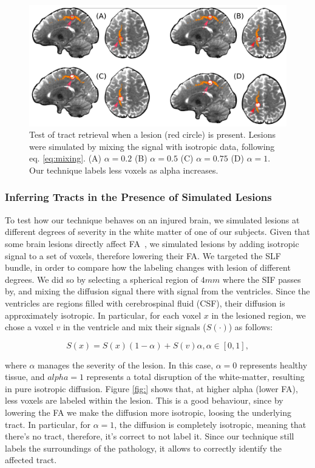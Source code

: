 \begin{figure}[t]
    \includegraphics[width=\textwidth]{7.multiatlas/img/pathology.png}
    \caption{Test of tract retrieval when a lesion (red circle) is present.
             Lesions were simulated by mixing the signal with isotropic data,
             following eq. \ref{eq:mixing}. (A) $\alpha=0.2$
             (B) $\alpha=0.5$ (C) $\alpha=0.75$ (D) $\alpha=1$. Our technique
             labels less voxels as alpha increases.}
    \label{fig:labeling}
\end{figure}

\subsubsection{Inferring Tracts in the Presence of Simulated Lesions}
To test how our technique behaves on an injured brain, we simulated
lesions at different degrees of severity in the white matter of one of our subjects.
Given that some brain lesions directly affect FA~\cite{Schonberg2006, Huisman2009},
we simulated lesions by adding isotropic signal to a set of voxels, therefore
lowering their FA. We targeted the SLF bundle, in order to compare how the labeling
changes with lesion of different degrees. We did so by selecting a spherical region
of $4mm$ where the SIF passes by, and mixing the diffusion signal there with signal
from the ventricles. Since the ventricles are regions filled with cerebrospinal
fluid (CSF), their diffusion is approximately isotropic. In particular, for each
voxel $x$ in the lesioned region, we chose a voxel $v$ in the ventricle and mix
their signals ($S(\cdot)$) as follows:

\begin{equation}
    \label{eq:mixing}
S(x) = S(x)(1-\alpha) + S(v)\alpha, \alpha \in [0,1],
\end{equation}

where $\alpha$ manages the severity of the lesion. In this case, $\alpha=0$
represents healthy tissue, and $alpha=1$ represents a total disruption of
the white-matter, resulting in pure isotropic diffusion. Figure \ref{fig:}
shows that, at higher alpha (lower FA), less voxels are labeled within the lesion.
This is a good behaviour, since by lowering the FA we make the diffusion more
isotropic, loosing the underlying tract. In particular, for $\alpha=1$, the
diffusion is completely isotropic, meaning that there's no tract, therefore,
it's correct to not label it. Since our technique still labels the surroundings
of the pathology, it allows to correctly identify the affected tract.

